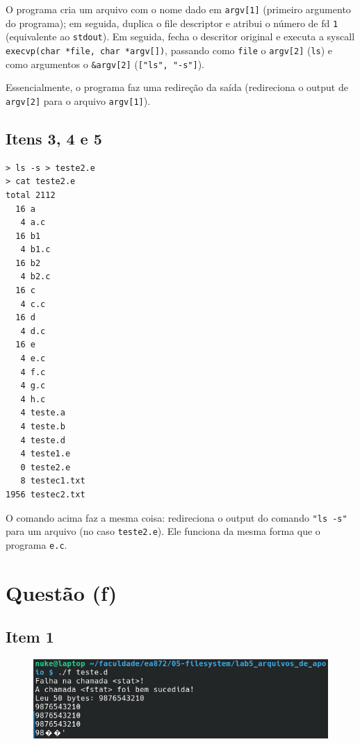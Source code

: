\documentclass{article}
\begin{document}
O programa cria um arquivo com o nome dado em \texttt{argv[1]} (primeiro argumento do programa); em seguida, duplica o file descriptor e atribui o número de fd \texttt{1} (equivalente ao \texttt{stdout}). Em seguida, fecha o descritor original e executa a syscall \texttt{execvp(char *file, char *argv[])}, passando como \texttt{file} o \texttt{argv[2]} (\texttt{ls}) e como argumentos o \texttt{\&argv[2]} (\texttt{["ls", "-s"]}).

Essencialmente, o programa faz uma redireção da saída (redireciona o output de \texttt{argv[2]} para o arquivo \texttt{argv[1]}).

\subsection*{Itens 3, 4 e 5}

\begin{verbatim}
> ls -s > teste2.e
> cat teste2.e
total 2112
  16 a
   4 a.c
  16 b1
   4 b1.c
  16 b2
   4 b2.c
  16 c
   4 c.c
  16 d
   4 d.c
  16 e
   4 e.c
   4 f.c
   4 g.c
   4 h.c
   4 teste.a
   4 teste.b
   4 teste.d
   4 teste1.e
   0 teste2.e
   8 testec1.txt
1956 testec2.txt
\end{verbatim}

O comando acima faz a mesma coisa: redireciona o output do comando \texttt{"ls -s"} para um arquivo (no caso \texttt{teste2.e}). Ele funciona da mesma forma que o programa \texttt{e.c}.

\section*{Questão (f)}

\subsection*{Item 1}
\begin{figure}[!ht]
    \begin{center}
        \includegraphics[width=\textwidth]{images/questao_f.png}
    \end{center}
\end{figure} 
\FloatBarrier
\end{document}
